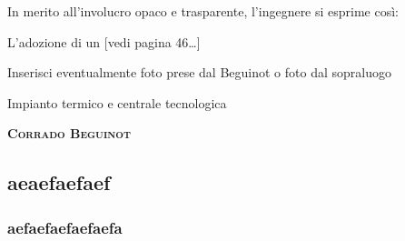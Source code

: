 \vspace{0.5em}
\noindent In merito all'involucro opaco e trasparente, l'ingegnere si esprime così:

\vspace{0.5em}

L'adozione di un [vedi pagina 46\dots]

Inserisci eventualmente foto prese dal Beguinot o foto dal sopraluogo

Impianto termico e centrale tecnologica


\vspace{1em}
\begin{flushright}
	\textbf{\textsc{Corrado Beguinot}}
\end{flushright}
\newpage
\subsection{aeaefaefaef}
\subsubsection{aefaefaefaefaefa}